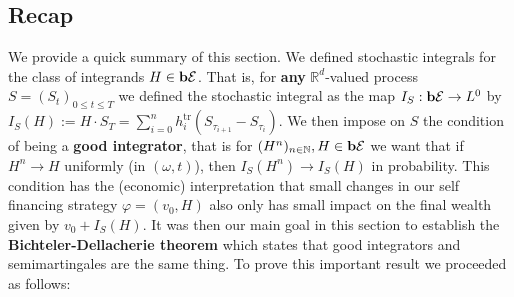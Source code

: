 \documentclass[12pt,a4paper, twoside]{article}
\theoremstyle{definition}
\newcommand{\simple}{\textbf{\text{b}}\mathcal{E}}
\begin{document}
\subsection{Recap}
We provide a quick summary of this section. We defined stochastic integrals for the class of integrands $H \in \simple$. That is, for \textbf{any} $\mathbb{R}^d$-valued process $S=(S_t)_{0 \leq t \leq T}$ we defined the stochastic integral as the map $I_S: \simple \to L^0$ by $I_S(H):= H \cdot S_T = \sum_{i=0}^n h_i^\text{tr} (S_{\tau_{i+1}}-S_{\tau_i})$. We then impose on $S$ the condition of being a \textbf{good integrator}, that is for $(H^n)_{n \in \mathbb{N}}, H \in \simple$ we want that if $H^n \to H$ uniformly (in $(\omega,t)$), then $I_S(H^n) \to I_S(H)$ in probability. This condition has the (economic) interpretation that small changes in our self financing strategy $\varphi=(v_0, H)$ also only has small impact on the final wealth given by $v_0 + I_S(H)$. It was then our main goal in this section to establish the \textbf{Bichteler-Dellacherie theorem} which states that good integrators and semimartingales are the same thing. To prove this important result we proceeded as follows:
\end{document}
